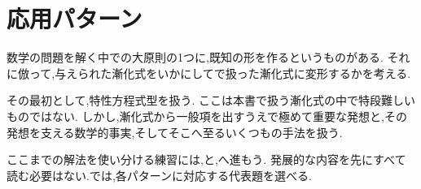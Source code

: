 ﻿%

\section{応用パターン}\label{節：応用パターン}
  数学の問題を解く中での大原則の1つに,既知の形を作るというものがある.
  それに倣って,与えられた漸化式をいかにしてで扱った漸化式に変形するかを考える.

  その最初として,特性方程式型を扱う.
  ここは本書で扱う漸化式の中で特段難しいものではない.
  しかし,漸化式から一般項を出すうえで極めて重要な発想と,その発想を支える数学的事実,そしてそこへ至るいくつもの手法を扱う.
  

ここまでの解法を使い分ける練習には,と,へ進もう.
発展的な内容を先にすべて読む必要はない.では,各パターンに対応する代表題を選べる.
